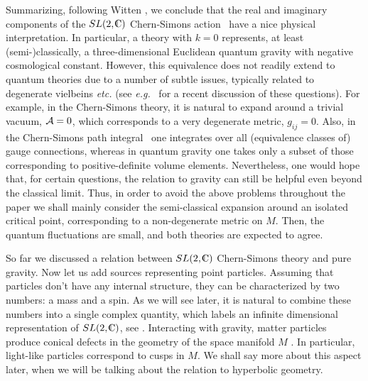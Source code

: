 Summarizing, following Witten \Wittengrav, we conclude that
the real and imaginary components of the $SL(2, \IC)$ Chern-Simons
action \iaction\ have a nice physical interpretation.
In particular, a theory with $k=0$ represents,
at least (semi-)classically, a three-dimensional Euclidean
quantum gravity with negative cosmological
constant.
However, this equivalence does not readily extend to quantum
theories due to a number of subtle issues, typically related
to degenerate vielbeins {\it etc.} (see {\it e.g.} \Matschull\
for a recent discussion of these questions).
For example,
in the Chern-Simons theory, it is natural
to expand around a trivial vacuum, ${\cal A}=0$, which corresponds
to a very degenerate metric, $g_{ij}=0$. Also,
in the Chern-Simons path integral \zpathint\ one integrates
over all (equivalence classes of) gauge connections,
whereas in quantum gravity one takes only a subset
of those corresponding to positive-definite volume elements.
Nevertheless, one would hope that, for certain questions,
the relation to gravity can still be helpful
even beyond the classical limit.
Thus, in order to avoid the above problems
throughout the paper we shall mainly consider
the semi-classical expansion around an isolated critical point,
corresponding to a non-degenerate metric on $M$.
Then, the quantum fluctuations are small,
and both theories are expected to agree.

So far we discussed a relation between
$SL(2, \IC)$ Chern-Simons theory and pure gravity.
Now let us add sources representing point particles.
Assuming that particles don't have any internal
structure, they can be characterized by two
numbers: a mass and a spin.
As we will see later, it is natural to combine these
numbers into a single complex quantity, which labels
an infinite dimensional representation of $SL(2,\IC)$,
see .
Interacting with gravity, matter particles produce
conical defects in the geometry of the space
manifold $M$ .
In particular, light-like particles correspond to cusps in $M$.
We shall say more about this aspect later, when we will be
talking about the relation to hyperbolic geometry.

